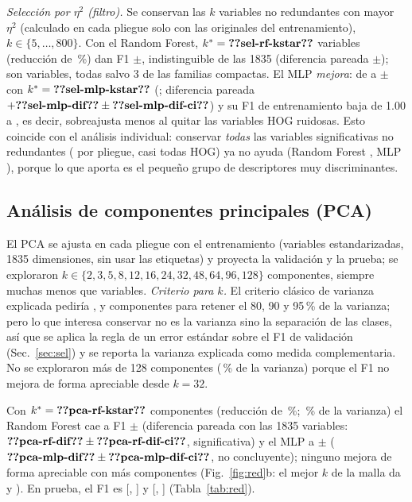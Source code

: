 \documentclass[journal]{IEEEtran}
\begin{document}
\emph{Selección por $\eta^2$ (filtro).} Se conservan las $k$ variables no redundantes con mayor $\eta^2$ (calculado en cada pliegue solo con las originales del entrenamiento), $k\in\{5,\dots,800\}$. Con el Random Forest, $k^*=\N{sel-rf-kstar}$ variables (reducción de \,\%) dan F1 $\pm$, indistinguible de las 1835 (diferencia pareada $\pm$); son  variables, todas salvo 3 de las familias compactas. El MLP \emph{mejora}: de  a $\pm$ con $k^*=\N{sel-mlp-kstar}$ (; diferencia pareada $+\N{sel-mlp-dif}\pm\N{sel-mlp-dif-ci}$) y su F1 de entrenamiento baja de 1.00 a , es decir, sobreajusta menos al quitar las variables HOG ruidosas. Esto coincide con el análisis individual: conservar \emph{todas} las variables significativas no redundantes ( por pliegue, casi todas HOG) ya no ayuda (Random Forest , MLP ), porque lo que aporta es el pequeño grupo de descriptores muy discriminantes.

\subsection{Análisis de componentes principales (PCA)}\label{sec:pca}
El PCA \cite{jolliffe2002} se ajusta en cada pliegue con el entrenamiento (variables estandarizadas, 1835 dimensiones, sin usar las etiquetas) y proyecta la validación y la prueba; se exploraron $k\in\{2,3,5,8,12,16,24,32,48,64,96,128\}$ componentes, siempre muchas menos que variables. \emph{Criterio para $k$.} El criterio clásico de varianza explicada pediría ,  y  componentes para retener el 80, 90 y 95\,\% de la varianza; pero lo que interesa conservar no es la varianza sino la separación de las clases, así que se aplica la regla de un error estándar sobre el F1 de validación (Sec.~\ref{sec:sel}) y se reporta la varianza explicada como medida complementaria. No se exploraron más de 128 componentes (\,\% de la varianza) porque el F1 no mejora de forma apreciable desde $k=32$.

Con $k^*=\N{pca-rf-kstar}$ componentes (reducción de \,\%; \,\% de la varianza) el Random Forest cae a F1 $\pm$ (diferencia pareada con las 1835 variables: $\N{pca-rf-dif}\pm\N{pca-rf-dif-ci}$, significativa) y el MLP a $\pm$ ($\N{pca-mlp-dif}\pm\N{pca-mlp-dif-ci}$, no concluyente); ninguno mejora de forma apreciable con más componentes (Fig.~\ref{fig:red}b: el mejor $k$ de la malla da  y ). En prueba, el F1 es  [, ] y  [, ] (Tabla~\ref{tab:red}).
\end{document}
